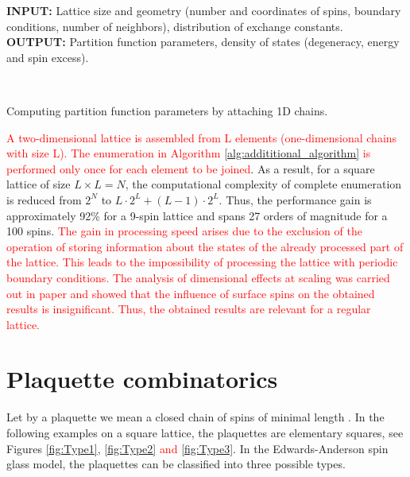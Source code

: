 \documentclass[preprint,12pt]{elsarticle}
\begin{document}
	\begin{algorithm}[H]
		\textbf{INPUT:} Lattice size and geometry (number and coordinates of spins, boundary conditions, number of neighbors), distribution of exchange constants.\\
		\textbf{OUTPUT:} Partition function parameters, density of states (degeneracy, energy and spin excess).
		\begin{algorithmic}
			{
				{
				}
				\ENDFOR \\
			}
			\ENDFOR
		\end{algorithmic}
		\caption{Computing partition function parameters by attaching 1D chains.}
		\label{alg:addititional_algorithm}
	\end{algorithm}
	
	\textcolor{red}{A two-dimensional lattice is assembled from L elements (one-dimensional chains with size L). The enumeration in Algorithm \ref{alg:addititional_algorithm} is performed only once for each element to be joined}. As a result, for a square lattice of size $L \times L = N$, the computational complexity of complete enumeration is reduced from $2^{N}$ to $L \cdot 2^L + (L - 1) \cdot 2^L$. Thus, the performance gain is approximately 92\% for a 9-spin lattice and spans 27 orders of magnitude for a 100 spins. \textcolor{red}{The gain in processing speed arises due to the exclusion of the operation of storing information about the states of the already processed part of the lattice. This leads to the impossibility of processing the lattice with periodic boundary conditions. The analysis of dimensional effects at scaling was carried out in paper \cite{trukhin2024thermodynamic} and showed that the influence of surface spins on the obtained results is insignificant. Thus, the obtained results are relevant for a regular lattice.}
	
	\section{Plaquette combinatorics}
	
	Let by a plaquette we mean a closed chain of spins of minimal length \cite{lebrecht2015j}. In the following examples on a square lattice, the plaquettes are elementary squares, see Figures \ref{fig:Type1}, \ref{fig:Type2} \textcolor{red}{and} \ref{fig:Type3}. In the Edwards-Anderson spin glass model, the plaquettes can be classified into three possible types. 
	
\end{document}
